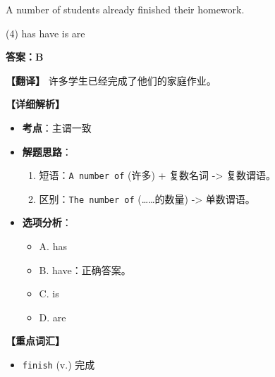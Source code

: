 \documentclass[11pt, a4paper]{article}
\newcommand{\analysis}[4]{
    \begin{solutionbox}
        \textbf{答案：#1}
        
        \textbf{【翻译】} #2
        
        \textbf{【详细解析】}
        #3
        
        \textbf{【重点词汇】}
        #4
    \end{solutionbox}
}
\newcommand{\blank}{\underline{\hspace{1.5cm}}}
\begin{document}
\begin{questions}
    \item A number of students \blank already finished their homework.
    \begin{tasks}(4)
        \task has \task have \task is \task are
    \end{tasks}
    \analysis{B}{许多学生已经完成了他们的家庭作业。}{
        \begin{itemize}
            \item \textbf{考点}：主谓一致
            \item \textbf{解题思路}：
                \begin{enumerate}
                    \item 短语：\texttt{A number of} (许多) + 复数名词 -> 复数谓语。
                    \item 区别：\texttt{The number of} (……的数量) -> 单数谓语。
                \end{enumerate}
            \item \textbf{选项分析}：
                \begin{itemize}
                    \item A. has
                    \item B. have：正确答案。
                    \item C. is
                    \item D. are
                \end{itemize}
        \end{itemize}
    }{
        \begin{itemize}
            \item \texttt{finish} (v.) 完成
        \end{itemize}
    }


\end{questions}
\end{document}
